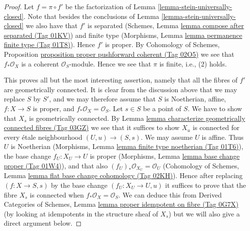 \documentclass{amsart}
\theoremstyle{plain}
\theoremstyle{definition}
\theoremstyle{remark}
\numberwithin{equation}{subsection}
\begin{document}
\begin{proof}
Let $f = \pi \circ f'$ be the factorization of
Lemma \ref{lemma-stein-universally-closed}. Note that besides the
conclusions of Lemma \ref{lemma-stein-universally-closed} we
also have that $f'$ is separated
(Schemes, Lemma \href{https://stacks.math.columbia.edu/tag/01KV}{lemma compose after separated (Tag 01KV)})
and finite type
(Morphisms, Lemma \href{https://stacks.math.columbia.edu/tag/01T8}{lemma permanence finite type (Tag 01T8)}).
Hence $f'$ is proper. By
Cohomology of Schemes, Proposition
\href{https://stacks.math.columbia.edu/tag/02O5}{proposition proper pushforward coherent (Tag 02O5)}
we see that $f_*\mathcal{O}_X$ is a coherent $\mathcal{O}_S$-module.
Hence we see that $\pi$ is finite, i.e., (2) holds.

\medskip\noindent
This proves all but the most interesting assertion, namely that
all the fibres of $f'$ are geometrically connected.
It is clear from the discussion above that we may replace $S$ by $S'$,
and we may therefore assume that $S$ is Noetherian, affine,
$f : X \to S$ is proper, and $f_*\mathcal{O}_X = \mathcal{O}_S$.
Let $s \in S$ be a point of $S$. We have to show that $X_s$ is
geometrically connected. By Lemma
\href{https://stacks.math.columbia.edu/tag/03GZ}{lemma characterize geometrically connected fibres (Tag 03GZ)}
we see that it suffices to show $X_u$ is connected
for every \'etale neighbourhood $(U, u) \to (S, s)$.
We may assume $U$ is affine. Thus $U$ is Noetherian
(Morphisms, Lemma \href{https://stacks.math.columbia.edu/tag/01T6}{lemma finite type noetherian (Tag 01T6)}),
the base change $f_U : X_U \to U$ is proper
(Morphisms, Lemma \href{https://stacks.math.columbia.edu/tag/01W4}{lemma base change proper (Tag 01W4)}),
and that also $(f_U)_*\mathcal{O}_{X_U} = \mathcal{O}_U$
(Cohomology of Schemes, Lemma \href{https://stacks.math.columbia.edu/tag/02KH}{lemma flat base change cohomology (Tag 02KH)}).
Hence after replacing
$(f : X \to S, s)$ by the base change $(f_U : X_U \to U, u)$
it suffices to prove that the fibre $X_s$ is connected when
$f_*\mathcal{O}_X = \mathcal{O}_S$. We can deduce this
from Derived Categories of Schemes, Lemma
\href{https://stacks.math.columbia.edu/tag/0G7X}{lemma proper idempotent on fibre (Tag 0G7X)}
(by looking at idempotents in the structure sheaf of $X_s$)
but we will also give a direct argument below.


\end{proof}
\end{document}
